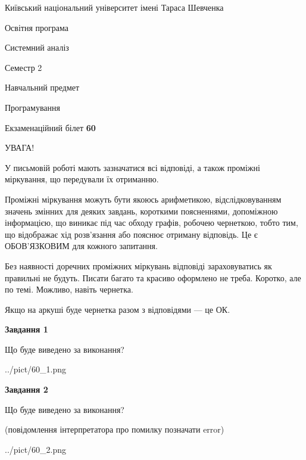 \documentclass[12pt, ukrainian]{article}
\begin{document}
{{\begin {small}\par
{ \center  Київський національний університет імені Тараса Шевченка \par}
{\parbox {5 cm}{Освітня програма \hfill}{\parbox {7 cm}{Системний аналіз \hfill}}\parbox {6 cm}{\hfill Семестр 2}}\par
{\parbox {5 cm} {Навчальний предмет \hfill}\parbox {7 cm}{Програмування \hfill}\parbox {6cm}{\hfill}\par}\vspace{-7pt} \end{small}}{\center Екзаменаційний білет \No \textbf
{ 60 }\par}}
{
\begin {large}
УВАГА!

У письмовій роботі мають зазначатися всі відповіді, а також проміжні міркування, що передували їх отриманню.

Проміжні міркування можуть бути якоюсь арифметикою, відслідковуванням зна\-чень змінних для деяких завдань,
короткими поясненнями, допоміжною інформацією, що виникає під час обходу графів, робочею чернеткою,
тобто тим, що відображає хід розв’язання або пояснює отриману відповідь.
Це є ОБОВ’ЯЗКОВИМ для кожного запитання.

Без наявності доречних проміжних міркувань відповіді зараховуватись як правиль\-ні не будуть.
Писати багато та красиво оформлено не треба. Коротко, але по темі. Можли\-во, навіть чернетка.

Якщо на аркуші буде чернетка разом з відповідями --- це ОК.

\newpage

{\begin {center}\textbf{Завдання 1}\end {center}}\par
Що буде виведено за виконання?\par
\begin{center}
	{../pict/60_1.png}
\end{center}
\newpage

{\begin {center}\textbf{Завдання 2}\end {center}}\par
Що буде виведено за виконання?\par
 (повідомлення інтерпретатора про помилку позначати error)\par
\begin{center}
	{../pict/60_2.png}
\end{center}
\newpage


\end{large}}
\end{document}
